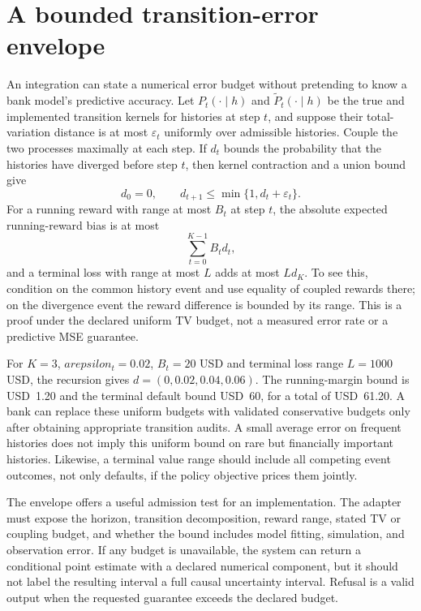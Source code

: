 \section{A bounded transition-error envelope}
\label{exec17:s5-error}

An integration can state a numerical error budget without pretending to know a
bank model's predictive accuracy. Let $P_t(\cdot\mid h)$ and
$\widetilde P_t(\cdot\mid h)$ be the true and implemented transition kernels
for histories at step $t$, and suppose their total-variation distance is at
most $\varepsilon_t$ uniformly over admissible histories. Couple the two
processes maximally at each step. If $d_t$ bounds the probability that the
histories have diverged before step $t$, then kernel contraction and a union
bound give
\begin{equation}
 d_0=0,\qquad d_{t+1}\leq\min\{1,d_t+\varepsilon_t\}.
 \label{exec17:s5-tv-recursion}
\end{equation}
For a running reward with range at most $B_t$ at step $t$, the absolute
expected running-reward bias is at most
\begin{equation}
 \sum_{t=0}^{K-1}B_t d_t,
 \label{exec17:s5-running-bound}
\end{equation}
and a terminal loss with range at most $L$ adds at most $Ld_K$. To see this,
condition on the common history event and use equality of coupled rewards
there; on the divergence event the reward difference is bounded by its range.
This is a proof under the declared uniform TV budget, not a measured error
rate or a predictive MSE guarantee.

For $K=3$, $arepsilon_t=0.02$, $B_t=20$ USD and terminal loss range
$L=1000$ USD, the recursion gives
$d=(0,0.02,0.04,0.06)$. The running-margin bound is USD~1.20 and the terminal
default bound USD~60, for a total of USD~61.20. A bank can replace these
uniform budgets with validated conservative budgets only after obtaining
appropriate transition audits. A small average error on frequent histories
does not imply this uniform bound on rare but financially important histories.
Likewise, a terminal value range should include all competing event outcomes,
not only defaults, if the policy objective prices them jointly.

The envelope offers a useful admission test for an implementation. The
adapter must expose the horizon, transition decomposition, reward range,
stated TV or coupling budget, and whether the bound includes model fitting,
simulation, and observation error. If any budget is unavailable, the system
can return a conditional point estimate with a declared numerical component,
but it should not label the resulting interval a full causal uncertainty
interval. Refusal is a valid output when the requested guarantee exceeds the
declared budget.

